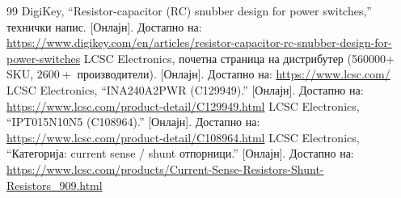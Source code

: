 \documentclass[journal,onecolumn,11pt]{IEEEtran}
\begin{document}
\begin{thebibliography}{99}
 DigiKey, ``Resistor-capacitor (RC) snubber design for power switches,''
технички напис. [Онлајн]. Достапно на:
\url{https://www.digikey.com/en/articles/resistor-capacitor-rc-snubber-design-for-power-switches}
 LCSC Electronics, почетна страница на дистрибутер (\num{560000}+ SKU, \(2600+\) производители).
[Онлајн]. Достапно на: \url{https://www.lcsc.com/}
 LCSC Electronics, ``INA240A2PWR (C129949).'' [Онлајн]. Достапно на:
\url{https://www.lcsc.com/product-detail/C129949.html}
 LCSC Electronics, ``IPT015N10N5 (C108964).'' [Онлајн]. Достапно на:
\url{https://www.lcsc.com/product-detail/C108964.html}
 LCSC Electronics, ``Категорија: current sense / shunt отпорници.'' [Онлајн]. Достапно на:
\url{https://www.lcsc.com/products/Current-Sense-Resistors-Shunt-Resistors_909.html}
\end{thebibliography}
\end{document}
